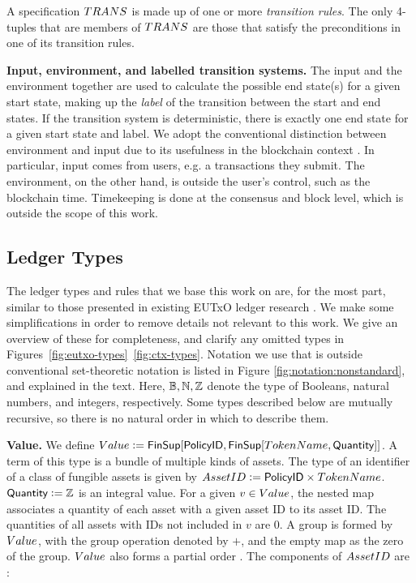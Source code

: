 A specification $\TRANS$ is made up of one or more
\emph{transition rules}. The only 4-tuples that are members of $\TRANS$ are those that
satisfy the preconditions in one of its transition rules.

\textbf{Input, environment, and labelled transition systems. }
The input and the environment together are used to calculate the possible
end state(s) for a given start state, making up the \emph{label} of the
transition between the start and end states. If the transition system is
deterministic, there is exactly one end state for a given start state and label.
We adopt the conventional distinction between environment and input due to
its usefulness in the blockchain context \cite{shelley}.
In particular, input comes from users, e.g. a transactions they submit.
The environment, on the other hand, is outside the user's control, such as
the blockchain time. Timekeeping is done at the consensus and block level,
which is outside the scope of this work.

\subsection{Ledger Types}
The ledger types and rules that we base this work on are, for the most part, similar to those
presented in existing EUTxO ledger research \cite{eutxoma}. We make some simplifications
in order to remove details not relevant to this work. We give an overview
of these for completeness, and clarify any omitted types
in Figures~\ref{fig:eutxo-types}~\ref{fig:ctx-types}.
Notation we use that is outside conventional set-theoretic notation is listed
in Figure \ref{fig:notation:nonstandard}, and explained in the text.
Here, $\mathbb{B}, \mathbb{N}, \mathbb{Z}$ denote the type of Booleans, natural numbers, and integers, respectively.
Some types described below are mutually recursive, so there is no natural
order in which to describe them.


\textbf{Value. } We define $\Value \leteq \FinSup{\Policy}{\FinSup{\TokenName}{\Quantity}}$.
A term of this type is a bundle of multiple kinds of assets.
The type of an identifier of a class of fungible assets is given by
$\AssetID \leteq \Policy \times \TokenName$.
$\textsf{Quantity} \mathrel{\mathop:}= \mathbb{Z}$ is an integral value.
For a given $v \in \Value$, the nested map associates a quantity of each asset
with a given asset ID to its asset ID. The quantities of all assets with IDs not
included in $v$ are $0$. A group is formed by $\Value$,
with the group operation denoted by $+$, and the empty map as the zero of the group.
$\Value$ also forms a partial order \cite{utxoma}.
The components of $\AssetID$ are :

